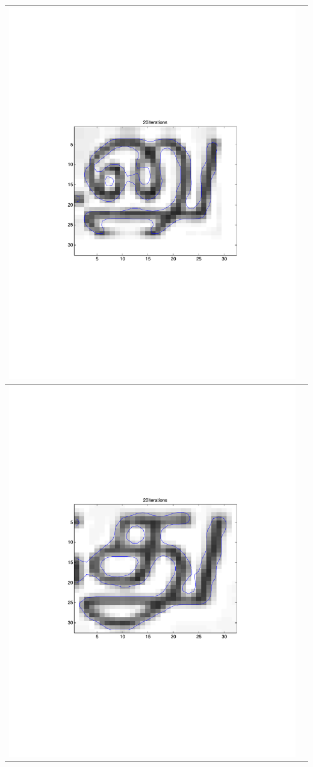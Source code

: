 \documentclass{beamer}
\begin{document}
\begin{frame}
\begin{center}
\begin{tabular}{ | c | c |}
\includegraphics[scale=0.1]{./img/nu} \\ \hline
\includegraphics[scale=0.1]{./img/tu} &

\end{tabular}
\end{center}
\end{frame}
\end{document}
